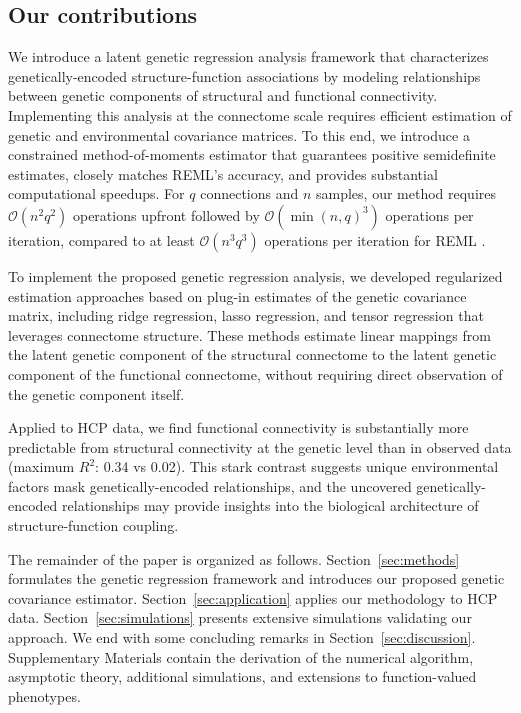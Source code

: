 \documentclass[12pt]{article}
\begin{document}
\subsection{Our contributions}

We introduce a latent genetic regression analysis framework that characterizes genetically-encoded structure-function associations by modeling relationships between genetic components of structural and functional connectivity. Implementing this analysis at the connectome scale requires efficient estimation of genetic and environmental covariance matrices. To this end, we introduce a constrained method-of-moments estimator that guarantees positive semidefinite estimates, closely matches REML’s accuracy, and provides substantial computational speedups. For $q$ connections and $n$ samples, our method requires $\mathcal{O}(n^2 q^2)$ operations upfront followed by $\mathcal{O}(\min(n, q)^3)$ operations per iteration, compared to at least $\mathcal{O}(n^3 q^3)$ operations per iteration for REML \parencite{bates2015fitting}.

To implement the proposed genetic regression analysis, we developed regularized estimation approaches based on plug-in estimates of the genetic covariance matrix, including ridge regression, lasso regression, and tensor regression that leverages connectome structure. These methods estimate linear mappings from the latent genetic component of the structural connectome to the latent genetic component of the functional connectome, without requiring direct observation of the genetic component itself.

Applied to HCP data, we find functional connectivity is substantially more predictable from structural connectivity at the genetic level than in observed data (maximum $R^2$: 0.34 vs 0.02). This stark contrast suggests unique environmental factors mask genetically-encoded relationships, and the uncovered genetically-encoded relationships may provide insights into the biological architecture of structure-function coupling.

The remainder of the paper is organized as follows. Section~\ref{sec:methods} formulates the genetic regression framework and introduces our proposed genetic covariance estimator. Section~\ref{sec:application} applies our methodology to HCP data. Section~\ref{sec:simulations} presents extensive simulations validating our approach. We end with some concluding remarks in Section~\ref{sec:discussion}. Supplementary Materials contain the derivation of the numerical algorithm, asymptotic theory, additional simulations, and extensions to function-valued phenotypes.
\end{document}
